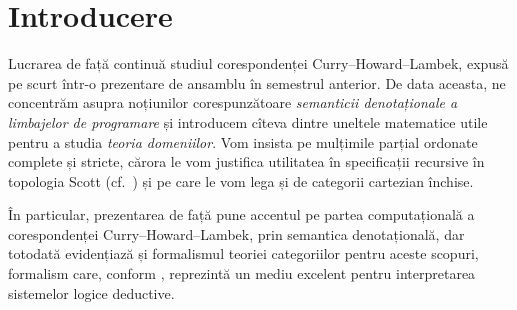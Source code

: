 \chapter*{Introducere}


\indent\indent Lucrarea de față continuă studiul corespondenței Curry--Howard--Lambek,
expusă pe scurt într-o prezentare de ansamblu în semestrul anterior. De data aceasta,
ne concentrăm asupra noțiunilor corespunzătoare \emph{semanticii denotaționale a %
  limbajelor de programare} și introducem cîteva dintre uneltele matematice utile
pentru a studia \emph{teoria domeniilor}. Vom insista pe mulțimile parțial ordonate
complete și stricte, cărora le vom justifica utilitatea în specificații recursive
în topologia Scott (cf.\ \cite{scottstrachey}) și pe care le vom lega și de categorii
cartezian închise.

În particular, prezentarea de față pune accentul pe partea computațională a
co\-res\-pon\-den\-ței Curry--Howard--Lambek, prin semantica denotațională, dar totodată
evidențiază și formalismul teoriei categoriilor pentru aceste scopuri, formalism
care, conform \cite{lambek}, reprezintă un mediu excelent pentru interpretarea
sistemelor logice deductive.

